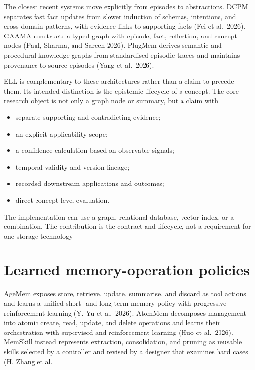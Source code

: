 \documentclass[
  english,
  a4paper,
  DIV=11,
  numbers=noendperiod]{scrreprt}
\providecommand{\tightlist}{%
  \setlength{\itemsep}{0pt}\setlength{\parskip}{0pt}}
\begin{document}
The closest recent systems move explicitly from episodes to
abstractions. DCPM separates fast fact updates from slower induction of
schemas, intentions, and cross-domain patterns, with evidence links to
supporting facts (Fei et al.~2026). GAAMA constructs a typed graph with
episode, fact, reflection, and concept nodes (Paul, Sharma, and Sareen
2026). PlugMem derives semantic and procedural knowledge graphs from
standardised episodic traces and maintains provenance to source episodes
(Yang et al.~2026).

ELL is complementary to these architectures rather than a claim to
precede them. Its intended distinction is the epistemic lifecycle of a
concept. The core research object is not only a graph node or summary,
but a claim with:

\begin{itemize}
\tightlist
\item
  separate supporting and contradicting evidence;
\item
  an explicit applicability scope;
\item
  a confidence calculation based on observable signals;
\item
  temporal validity and version lineage;
\item
  recorded downstream applications and outcomes;
\item
  direct concept-level evaluation.
\end{itemize}

The implementation can use a graph, relational database, vector index,
or a combination. The contribution is the contract and lifecycle, not a
requirement for one storage technology.

\section{Learned memory-operation
policies}\label{learned-memory-operation-policies}

AgeMem exposes store, retrieve, update, summarise, and discard as tool
actions and learns a unified short- and long-term memory policy with
progressive reinforcement learning (Y. Yu et al.~2026). AtomMem
decomposes management into atomic create, read, update, and delete
operations and learns their orchestration with supervised and
reinforcement learning (Huo et al.~2026). MemSkill instead represents
extraction, consolidation, and pruning as reusable skills selected by a
controller and revised by a designer that examines hard cases (H. Zhang
et al.
\end{document}
